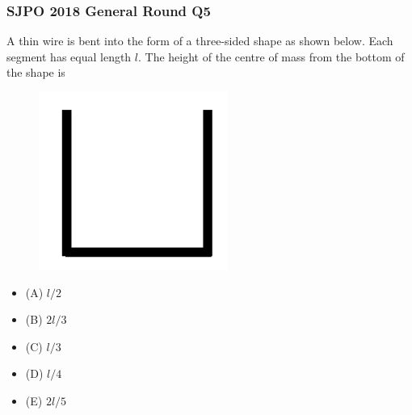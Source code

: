 \documentclass{article}
\begin{document}
\subsubsection{SJPO 2018 General Round Q5}
A thin wire is bent into the form of a three-sided shape as shown below. Each segment has equal length $l$. The height of the centre of mass from the bottom of the shape is \\
{
\begin{figure}
\includegraphics[width=1.0\linewidth]{images/sjpo2018q5.png}
\end{figure}
\begin{itemize}
\item[] (A) $l / 2$
\item[] (B) $2 l / 3$
\item[] (C) $l / 3$
\item[] (D) $l / 4$
\item[] (E) $2 l / 5$
\end{itemize}
}
\end{document}
